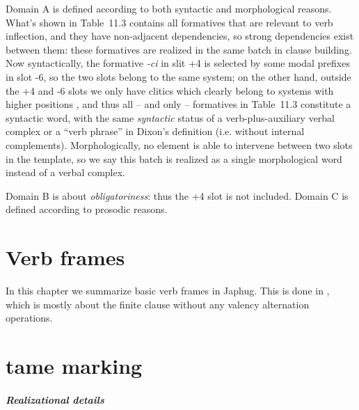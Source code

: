 \documentclass[a4paper, oneside, 12pt]{report}
\newcommand*{\citesec}[1]{\S~{#1}}
\newcommand*{\citetable}[1]{Table~{#1}}
\newcommand*{\citepage}[1]{p.~{#1}}
\newcommand{\form}[1]{\emph{#1}}
\begin{document}
Domain A is defined according to both syntactic and morphological reasons.
What's shown in 
\citetable{11.3} contains all formatives that are relevant to verb inflection,
and they have non-adjacent dependencies,
so strong dependencies exist between them:
these formatives are realized in the same batch 
in clause building.
Now syntactically, the formative \form{-ci} in slit +4 
is selected by some modal prefixes in slot -6,
so the two slots belong to the same system;
on the other hand, outside the +4 and -6 slots 
we only have clitics which clearly belong to systems with higher positions
\citep[\citesec{11.6.2}]{jacques2021grammar},
and thus all -- and only -- formatives in \citetable{11.3}
constitute a syntactic word,
with the same \emph{syntactic} status of a verb-plus-auxiliary verbal complex or a
``verb phrase'' in Dixon's definition (i.e. without internal complements). 
Morphologically, no element is able to intervene 
between two slots in the template, 
so we say this batch is realized as a single morphological word 
instead of a verbal complex.

Domain B is about \emph{obligatoriness}:
thus the +4 slot is not included.
Domain C is defined according to prosodic reasons.

\chapter{Verb frames}

In this chapter we summarize basic verb frames in Japhug.
This is done in \citet[\citepage{14}]{jacques2021grammar},
which is mostly about the finite clause without any valency alternation operations.

\chapter{\acs{tame} marking}


\paragraph*{Realizational details}
\end{document}
